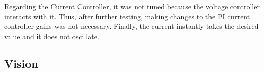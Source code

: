 \documentclass[a4paper]{article}
\begin{document}

Regarding the Current Controller, it was not tuned because the voltage controller
 interacts with it. Thus, after further testing, making changes to the PI current
  controller gains was not necessary. Finally, the current instantly takes the 
  desired value and it does not oscillate. 





\pagebreak
\subsection{Vision}
\end{document}
